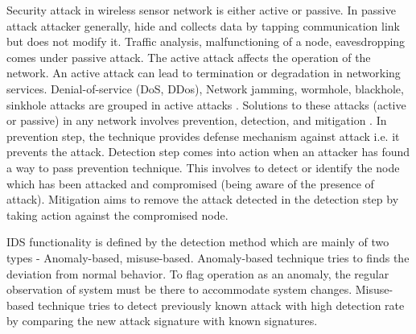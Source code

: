 Security attack in wireless sensor network is either active or passive. In passive attack attacker generally, hide and collects data by tapping communication link but does not modify it. Traffic analysis, malfunctioning of a node, eavesdropping comes under passive attack. The active attack affects the operation of the network. An active attack can lead to termination or degradation in networking services. Denial-of-service (DoS, DDos), Network jamming, wormhole, blackhole, sinkhole attacks are grouped in active attacks \cite{padmavathi2009survey}. Solutions to these attacks (active or passive) in any network involves prevention, detection, and mitigation \cite{fuchsberger2005intrusion}. In prevention step, the technique provides defense mechanism against attack i.e. it prevents the attack. Detection step comes into action when an attacker has found a way to pass prevention technique. This involves to detect or identify the node which has been attacked and compromised (being aware of the presence of attack). Mitigation aims to remove the attack detected in the detection step by taking action against the compromised node.
\par
IDS functionality is defined by the detection method which are mainly of two types - Anomaly-based, misuse-based. Anomaly-based technique tries to finds the deviation from normal behavior. To flag operation as an anomaly, the regular observation of system must be there to accommodate system changes. Misuse-based technique tries to detect previously known attack with high detection rate by comparing the new attack signature with known signatures.

